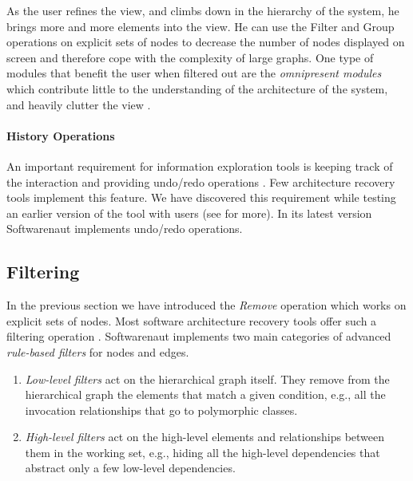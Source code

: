 \documentclass[preprint,12pt]{elsarticle}
\begin{document}
As the user refines the view, and climbs down in the hierarchy of the system, he brings more and more elements into the view. He can use the Filter and Group operations on explicit sets of nodes to decrease the number of nodes displayed on screen and therefore cope with the complexity of large graphs. One type of modules that benefit the user when filtered out are the {\em omnipresent modules} which contribute little to the understanding of the architecture of the system, and heavily clutter the view \cite{mitchell-bunch}.


\paragraph {History Operations} An important requirement for information exploration tools is keeping track of the interaction and providing undo/redo operations \cite{shneid-eyes}. Few architecture recovery tools implement this feature. We have discovered this requirement while testing an earlier version of the tool with users (see  for more). In its latest version Softwarenaut implements undo/redo operations.


\subsection {Filtering} 

In the previous section we have introduced the {\em Remove} operation which works on explicit sets of nodes. Most software architecture recovery tools offer such a filtering operation \cite{aracic-filtering}. 
Softwarenaut implements two main categories of advanced {\em rule-based filters} for nodes and edges. 

\begin{enumerate}

\item {\em Low-level filters} act on the hierarchical graph itself. They remove from the hierarchical graph the elements that match a given condition, e.g., all the invocation relationships that go to polymorphic classes.

\item {\em High-level filters} act on the high-level elements and relationships between them in the working set, e.g., hiding all the high-level dependencies that abstract only a few low-level dependencies.

\end{enumerate}
\end{document}
